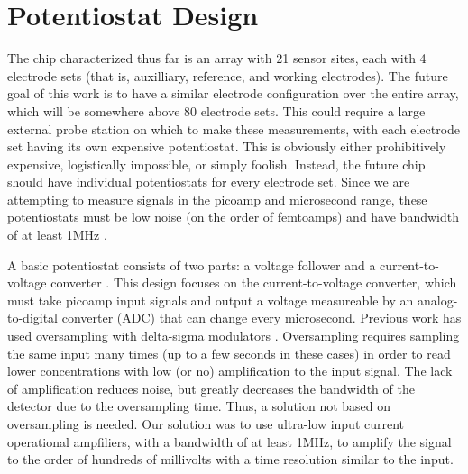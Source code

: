 \chapter{Potentiostat Design}

The chip characterized thus far is an array with 21 sensor sites, each with 4 electrode sets (that is, auxilliary, reference, and working electrodes). The future goal of this work is to have a similar electrode configuration over the entire array, which will be somewhere above 80 electrode sets. This could require a large external probe station on which to make these measurements, with each electrode set having its own expensive potentiostat. This is obviously either prohibitively expensive, logistically impossible, or simply foolish. Instead, the future chip should have individual potentiostats for every electrode set. Since we are attempting to measure signals in the picoamp and microsecond range, these potentiostats must be low noise (on the order of femtoamps) and have bandwidth of at least 1MHz \cite{mosharok2005aee}.

A basic potentiostat consists of two parts: a voltage follower and a current-to-voltage converter \cite{kissinger1996iai}. This design focuses on the current-to-voltage converter, which must take picoamp input signals and output a voltage measureable by an analog-to-digital converter (ADC) that can change every microsecond. Previous work has used oversampling with delta-sigma modulators \cite{murari2005ipn} \cite{stanacevic2007vpa}. Oversampling requires sampling the same input many times (up to a few seconds in these cases) in order to read lower concentrations with low (or no) amplification to the input signal. The lack of amplification reduces noise, but greatly decreases the bandwidth of the detector due to the oversampling time. Thus, a solution not based on oversampling is needed. Our solution was to use ultra-low input current operational ampfiliers, with a bandwidth of at least 1MHz, to amplify the signal to the order of hundreds of millivolts with a time resolution similar to the input.
